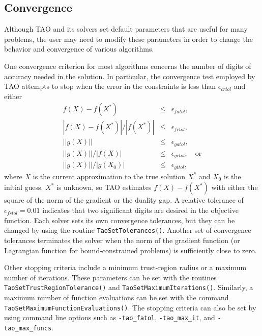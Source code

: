 \subsection{Convergence}\label{sec:customize}

Although TAO and its solvers set default parameters that are useful
for many problems, the user may need to modify these
parameters in order to change the behavior and convergence of various algorithms.

One convergence criterion for most algorithms concerns the number
of digits of accuracy needed in the solution.  In particular,
the convergence test employed by TAO attempts to stop when
the error in the constraints is less than $\epsilon_{crtol}$
and either
\[
\begin{array}{lcl}
f(X) - f(X^*)  &\leq& \epsilon_{fatol}, \\
|f(X) - f(X^*)| / |f(X^*)| &\leq& \epsilon_{frtol},\\
||g(X)|| &\leq& \epsilon_{gatol}, \\
||g(X)||/|f(X)| &\leq& \epsilon_{grtol}, \quad \mbox{or} \\
||g(X)||/|g(X_0)| &\leq& \epsilon_{gttol},
\end{array}
\]
where $X$ is the current approximation to the true solution $X^*$
and $X_0$ is the initial guess.
$X^*$ is unknown, so TAO estimates $f(X) - f(X^*)$ with either 
the square of the norm of the gradient or the duality gap.
A relative tolerance of $\epsilon_{frtol}=0.01$ indicates that two
significant digits are desired in the objective function.
Each solver sets its own  convergence tolerances, but they can
be changed by using the routine
{\tt TaoSetTolerances()}.
Another set of convergence tolerances 
terminates the solver when the norm of the gradient function
(or Lagrangian function for bound-constrained problems)
is sufficiently close to zero.

Other stopping criteria include a minimum trust-region radius or 
a maximum number of iterations.  These parameters can be set with
the routines {\tt Tao\-Set\-Trust\-Region\-Tolerance()}
and {\tt Tao\-Set\-Max\-imum\-Iter\-ations()}.
Similarly, a maximum number of function evaluations can be set 
with the command 
{\tt Tao\-Set\-Max\-imum\-Func\-tion\-Evaluations()}.
The stopping criteria can
also be set by using command line options such as \texttt{-tao\_fatol}, 
\texttt{-tao\_max\_it}, and \texttt{-tao\_max\_funcs}.

